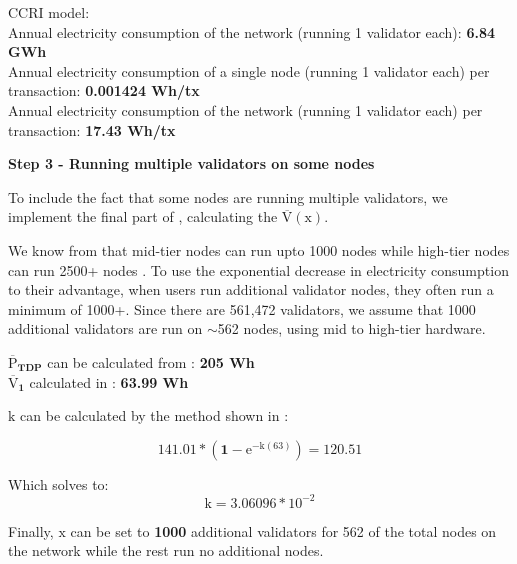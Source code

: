CCRI model: \\
Annual electricity consumption of the network (running 1 validator each): \textbf{6.84 GWh} \\
Annual electricity consumption of a single node (running 1 validator each) per transaction: \textbf{0.001424 Wh/tx} \\
Annual electricity consumption of the network (running 1 validator each) per transaction: \textbf{17.43 Wh/tx} \newline 

\textbf{ Step 3 - Running multiple validators on some nodes}

To include the fact that some nodes are running multiple validators, we implement the final part of , calculating the $\boldsymbol{\mathrm{\overline{V}(\mathrm{x})}}$. 

We know from  that mid-tier nodes can run upto 1000 nodes while high-tier nodes can run 2500+ nodes \cite{2021HardwareEthstaker} \cite{Kaushal2022ValidatingConference}. To use the exponential decrease in electricity consumption to their advantage, when users run additional validator nodes, they often run a minimum of 1000+. Since there are 561,472 validators, we assume that 1000 additional validators are run on $\sim$562 nodes, using mid to high-tier hardware.   

$\boldsymbol{\mathrm{\overline{P}}_{TDP}}$ can be calculated from : \textbf{205 Wh} \\
$\boldsymbol{ \overline{\mathrm{V}}_{1}}$ calculated in  : \textbf{63.99 Wh} 

$\boldsymbol{\mathrm{k}}$ can be calculated by the method shown in :

\begin{equation*}
    \boldsymbol{\mathrm{141.01} * (1-\mathrm{e}^{-\mathrm{k}(\mathrm{63})}) = \mathrm{120.51}}
\end{equation*}

Which solves to:
\begin{equation*}
    \boldsymbol{\mathrm{k} = \mathrm{{3.06096} * {10}^{-2}}}
\end{equation*}

Finally, $\boldsymbol{\mathrm{x}}$ can be set to \textbf{1000} additional validators for 562 of the total nodes on the network while the rest run no additional nodes.

